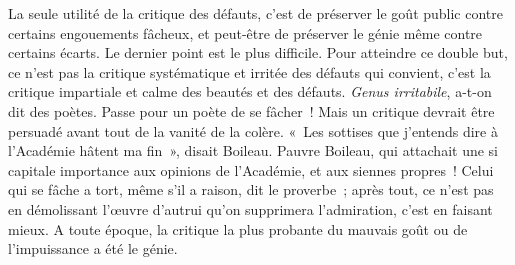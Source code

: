 \documentclass[french,twoside]{book} %
\begin{document}
La seule utilité de la critique des défauts, c’est de préserver le goût public contre certains engouements fâcheux, et peut-être de préserver le génie même contre certains écarts. Le dernier point est le plus difficile. Pour atteindre ce double but, ce n’est pas la critique systématique et irritée des défauts qui convient, c’est la critique impartiale et calme des beautés et des défauts. \emph{Genus irritabile}, a-t-on dit des poètes. Passe pour un poète de se fâcher ! Mais un critique devrait être persuadé avant tout de la vanité de la colère. « Les sottises que j’entends dire à l’Académie hâtent ma fin », disait Boileau. Pauvre Boileau, qui attachait une si capitale importance aux opinions de l’Académie, et aux siennes propres ! Celui qui se fâche a tort, même s’il a raison, dit le proverbe ; après tout, ce n’est pas en démolissant l’œuvre d’autrui qu’on supprimera l’admiration, c’est en faisant mieux. A toute époque, la critique la plus probante du mauvais goût ou de l’impuissance a été le génie.\par
\end{document}
